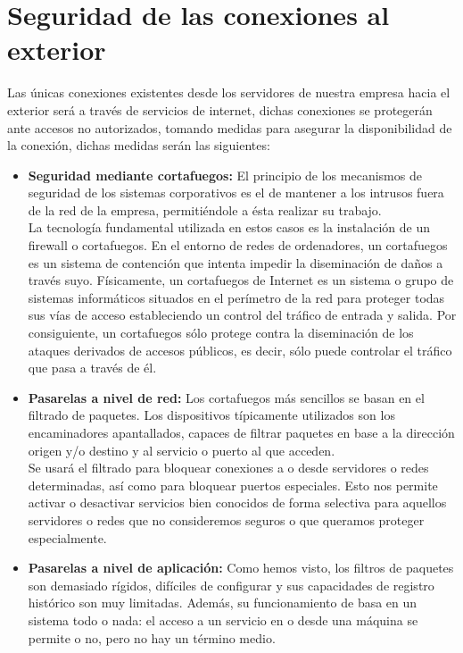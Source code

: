 \documentclass[11pt,bibtotoc,noliststotoc,BCOR0mm]{scrbook}
\begin{document}
\section{Seguridad de las conexiones al exterior}

Las únicas conexiones existentes desde los servidores de nuestra empresa hacia el exterior será a través de servicios de internet, dichas conexiones se protegerán ante accesos no autorizados, tomando medidas para asegurar la disponibilidad de la conexión, dichas medidas serán las siguientes:

\begin{itemize}
\item \textbf{Seguridad mediante cortafuegos:} El principio de los mecanismos de seguridad de los sistemas corporativos es el de mantener a los intrusos fuera de la red de la empresa, permitiéndole a ésta realizar su trabajo.\\
La tecnología fundamental utilizada en estos casos es la instalación de un firewall o cortafuegos. En el entorno de redes de ordenadores, un cortafuegos es un sistema de contención que intenta impedir la diseminación de daños a través suyo. Físicamente, un cortafuegos de Internet es un sistema o grupo de sistemas informáticos situados en el perímetro de la red para proteger todas sus vías de acceso estableciendo un control del tráfico de entrada y salida. Por consiguiente, un cortafuegos sólo protege contra la diseminación de los ataques derivados de accesos públicos, es decir, sólo puede controlar el tráfico que pasa a través de él.
\item \textbf{Pasarelas a nivel de red:} Los cortafuegos más sencillos se basan en el filtrado de paquetes. Los dispositivos típicamente utilizados son los encaminadores apantallados, capaces de filtrar paquetes en base a la dirección origen y/o destino y al servicio o puerto al que acceden.\\
Se usará el filtrado para bloquear conexiones a o desde servidores o redes determinadas, así como para bloquear puertos especiales. Esto nos permite activar o desactivar servicios bien conocidos de forma selectiva para aquellos servidores o redes que no consideremos seguros o que queramos proteger especialmente.
\item \textbf{Pasarelas a nivel de aplicación:} Como hemos visto, los filtros de paquetes son demasiado rígidos, difíciles de configurar y sus capacidades de registro histórico son muy limitadas. Además, su funcionamiento de basa en un sistema todo o nada: el acceso a un servicio en o desde una máquina se permite o no, pero no hay un término medio.\\

\end{itemize}
\end{document}
